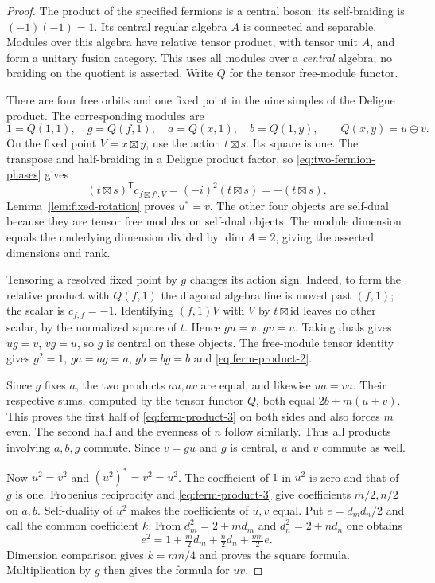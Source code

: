 \begin{proof}
The product of the specified fermions is a central boson: its
self-braiding is $(-1)(-1)=1$. Its central regular algebra $A$ is connected
and separable. Modules over this algebra have relative tensor product,
with tensor unit $A$, and form a unitary fusion category. This uses all
modules over a \emph{central} algebra; no braiding on the quotient is
asserted. Write $Q$ for the tensor free-module functor.

There are four free orbits and one fixed point in the nine simples of
the Deligne product. The corresponding modules are
\[
 1=Q(1,1),\quad g=Q(f,1),\quad a=Q(x,1),\quad b=Q(1,y),
 \qquad Q(x,y)=u\oplus v.
\]
On the fixed point $V=x\boxtimes y$, use the action $t\boxtimes s$.
Its square is one. The transpose and half-braiding in a Deligne product
factor, so \eqref{eq:two-fermion-phases} gives
\[
 (t\boxtimes s)^{\mathsf T}c_{f\boxtimes f',V}
   =(-i)^2(t\boxtimes s)=-(t\boxtimes s).
\]
Lemma~\ref{lem:fixed-rotation} proves $u^*=v$. The other four objects
are self-dual because they are tensor free modules on self-dual objects.
The module dimension equals the underlying dimension divided by
$\dim A=2$, giving the asserted dimensions and rank.

Tensoring a resolved fixed point by $g$ changes its action sign.
Indeed, to form the relative product with $Q(f,1)$ the diagonal algebra
line is moved past $(f,1)$; the scalar is $c_{f,f}=-1$. Identifying
$(f,1)V$ with $V$ by $t\boxtimes\mathrm{id}$ leaves no other scalar,
by the normalized square of $t$. Hence $gu=v$, $gv=u$.
Taking duals gives $ug=v$, $vg=u$, so $g$ is central on these objects.
The free-module tensor identity gives $g^2=1$, $ga=ag=a$, $gb=bg=b$
and \eqref{eq:ferm-product-2}.

Since $g$ fixes $a$, the two products $au,av$ are equal, and likewise
$ua=va$. Their respective sums, computed by the tensor functor $Q$,
both equal $2b+m(u+v)$. This proves the first half of
\eqref{eq:ferm-product-3} on both sides and also forces $m$ even.
The second half and the evenness of $n$ follow similarly. Thus all
products involving $a,b,g$ commute. Since $v=gu$ and $g$ is central,
$u$ and $v$ commute as well.

Now $u^2=v^2$ and $(u^2)^*=v^2=u^2$. The coefficient of $1$ in $u^2$
is zero and that of $g$ is one. Frobenius reciprocity and
\eqref{eq:ferm-product-3} give coefficients $m/2,n/2$ on $a,b$.
Self-duality of $u^2$ makes the coefficients of $u,v$ equal. Put
$e=d_md_n/2$ and call the common coefficient $k$. From
$d_m^2=2+md_m$ and $d_n^2=2+nd_n$ one obtains
\[
 e^2=1+\tfrac m2d_m+\tfrac n2d_n+\tfrac{mn}{2}e.
\]
Dimension comparison gives $k=mn/4$ and proves the square formula.
Multiplication by $g$ then gives the formula for $uv$.
\end{proof}

